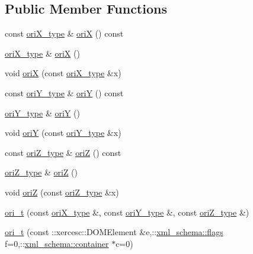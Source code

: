 \subsection*{Public Member Functions}
\begin{DoxyCompactItemize}
\item 
const \hyperlink{classori__t_a0d346be84e44760fbb97262b96c52110}{ori\-X\-\_\-type} \& \hyperlink{classori__t_ac531cde667e0a42e5142a1b6cba4d5d6}{ori\-X} () const 
\item 
\hyperlink{classori__t_a0d346be84e44760fbb97262b96c52110}{ori\-X\-\_\-type} \& \hyperlink{classori__t_aabb9fa666fe2e0c68f4f19107e31725c}{ori\-X} ()
\item 
void \hyperlink{classori__t_ad41734d912e1c04834981cbd0593736f}{ori\-X} (const \hyperlink{classori__t_a0d346be84e44760fbb97262b96c52110}{ori\-X\-\_\-type} \&x)
\item 
const \hyperlink{classori__t_ad04f9558bf4506128686a25e23817966}{ori\-Y\-\_\-type} \& \hyperlink{classori__t_a822dd139ec9b4c6fdb0dd76832cdc4b8}{ori\-Y} () const 
\item 
\hyperlink{classori__t_ad04f9558bf4506128686a25e23817966}{ori\-Y\-\_\-type} \& \hyperlink{classori__t_a570cffbf0928d39b86c715ff2e88743d}{ori\-Y} ()
\item 
void \hyperlink{classori__t_a06448162c8e97ac0373b9fc3ada36fc4}{ori\-Y} (const \hyperlink{classori__t_ad04f9558bf4506128686a25e23817966}{ori\-Y\-\_\-type} \&x)
\item 
const \hyperlink{classori__t_ade8315fb919208a45ec58303232b842b}{ori\-Z\-\_\-type} \& \hyperlink{classori__t_aa4cc5b125c6cf194c7f46f1309e9ab5c}{ori\-Z} () const 
\item 
\hyperlink{classori__t_ade8315fb919208a45ec58303232b842b}{ori\-Z\-\_\-type} \& \hyperlink{classori__t_a58e13e844f261fbd74d097377351d6ed}{ori\-Z} ()
\item 
void \hyperlink{classori__t_a3cccac2cb2c327e4cb72f2e9172a91c3}{ori\-Z} (const \hyperlink{classori__t_ade8315fb919208a45ec58303232b842b}{ori\-Z\-\_\-type} \&x)
\item 
\hyperlink{classori__t_a7005acb26895a32a12dad665fd3fd040}{ori\-\_\-t} (const \hyperlink{classori__t_a0d346be84e44760fbb97262b96c52110}{ori\-X\-\_\-type} \&, const \hyperlink{classori__t_ad04f9558bf4506128686a25e23817966}{ori\-Y\-\_\-type} \&, const \hyperlink{classori__t_ade8315fb919208a45ec58303232b842b}{ori\-Z\-\_\-type} \&)
\item 
\hyperlink{classori__t_a233c666eeeed1f06a4bf8889d0a0d790}{ori\-\_\-t} (const \-::xercesc\-::\-D\-O\-M\-Element \&e,\-::\hyperlink{namespacexml__schema_a0612287d030cb2732d31a45b258fdc87}{xml\-\_\-schema\-::flags} f=0,\-::\hyperlink{namespacexml__schema_ada9aa30dc722e93ee2ed7243085402a5}{xml\-\_\-schema\-::container} $\ast$c=0)

\end{DoxyCompactItemize}
